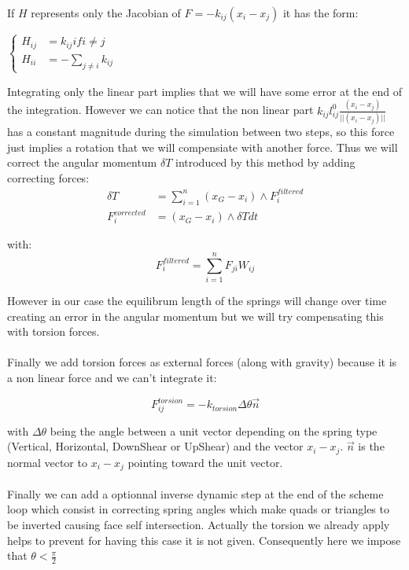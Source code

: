 \documentclass[12pt, a4paper]{memoir} %
\begin{document}
If $H$ represents only the Jacobian of $F = -k_{ij}(x_i - x_j)$ it has the form:\\
\begin{center}
$
\left\{
\begin{array}{ll}
H_{ij} &= k_{ij} if i \neq j \\
H_{ii} &= -\sum\limits_{j \neq i}k_{ij}
\end{array}
\right.
$
\end{center}

Integrating only the linear part implies that we will have some error at the end of the integration. However we can notice that the non linear part $k_{ij}l_{ij}^0\frac{(x_i - x_j)}{||(x_i - x_j)||}$ has a constant magnitude during the simulation between two steps, so this force just implies a rotation that we will compensiate with another force. Thus we will correct the angular momentum $\delta T$ introduced by this method by adding correcting forces:
\begin{align*}
\delta T &= \sum\limits_{i=1}^n (x_G - x_i)\wedge F_i^{filtered} \\
F_i^{corrected} &= (x_G - x_i)\wedge \delta T dt
\end{align*}

with:
\begin{equation}
F_i^{filtered} = \sum\limits_{i=1}^n F_{ji}W_{ij}
\end{equation}

However in our case the equilibrum length of the springs will change over time creating an error in the angular momentum but we will try compensating this with torsion forces.\\\\

Finally we add torsion forces as external forces (along with gravity) because it is a non linear force and we can't integrate it:

\begin{equation}
F_{ij}^{torsion} = -k_{torsion}\Delta \theta \vec{n}
\end{equation}

with $\Delta \theta$ being the angle between a unit vector depending on the spring type (Vertical, Horizontal, DownShear or UpShear) and the vector $x_i - x_j$. $\vec{n}$ is the normal vector to $x_i - x_j$ pointing toward the unit vector.\\\\

Finally we can add a optionnal inverse dynamic step at the end of the scheme loop which consist in correcting spring angles which make quads or triangles to be inverted causing face self intersection. Actually the torsion we already apply helps to prevent for having this case it is not given. Consequently here we impose that $\theta < \frac{\pi}{2}$ 
\end{document}
